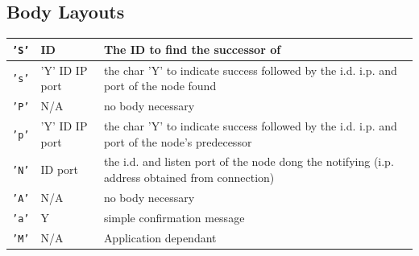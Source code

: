\documentclass{article}
\begin{document}
\subsection{Body Layouts}
\begin{tabular}{|l | l | L|}
\hline
\texttt{'S'} & ID & The ID to find the successor of\\\hline
\texttt{'s'} & 'Y' ID IP port & the char 'Y' to indicate success followed by the i.d. i.p. and port of the node found\\\hline
\texttt{'P'} & N/A & no body necessary\\\hline
\texttt{'p'} & 'Y' ID IP port & the char 'Y' to indicate success followed by the i.d. i.p. and port of the node's predecessor \\\hline
\texttt{'N'} & ID port & the i.d. and listen port of the node dong the notifying (i.p. address obtained from connection) \\\hline
\texttt{'A'} & N/A & no body necessary\\\hline
\texttt{'a'} & Y & simple confirmation message\\\hline
\texttt{'M'} & N/A & Application dependant\\\hline
\end{tabular}
\end{document}
